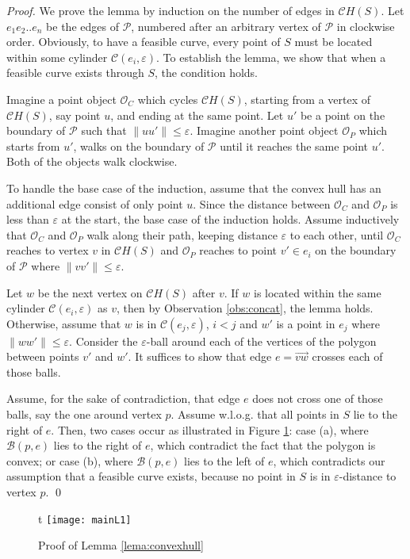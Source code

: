 \documentclass[a4paper,UKenglish]{lipics}
\newcommand{\eps}{\varepsilon}
\newcommand{\CB}{{\mathscr B}}
\newcommand{\CC}{{\mathscr C}}
\newcommand{\CO}{{\mathscr O}}
\newcommand{\Pol}{{\mathscr P}}
\newcommand{\CH}{{\mathscr CH}}
\newcommand{\Dir}{\overrightarrow}
\newcommand{\pset}{S}
\begin{document}
\begin{proof}
We prove the lemma by induction on the number of 
edges in $\CH(\pset)$. 
Let  $e_1e_2..e_n$ be the edges of $\Pol$, numbered 
after an arbitrary vertex of $\Pol$ in clockwise order. 
Obviously, to have a feasible curve, 
every point of $\pset$ must be located within some cylinder $\CC(e_i, \eps)$.
To establish the lemma, we show that when a feasible curve
exists through $\pset$, the condition holds. 

Imagine a point object
$\CO_C$ which cycles $\CH(\pset)$, 
starting from a vertex of 
$\CH(S)$, say point $u$, and ending at the same point.
Let $u'$ be a point on the boundary of $\Pol$ such that 
$\| uu' \| \le \eps$.
Imagine another point object $\CO_P$  
which starts from $u'$, 
walks on the boundary of $\Pol$ until it reaches the same point $u'$.
Both of the objects walk clockwise. 

To handle the base case of the induction, assume that 
the convex hull has an additional edge consist 
of only  point $u$. Since the distance between
$\CO_C$ and $\CO_P$ is less 
than $\eps$ at the start,
the base case of the induction holds. 
Assume inductively that $\CO_C$  and $\CO_P$
walk along their path, keeping distance $\eps$
to each other, until 
$\CO_C$  reaches to vertex $v$ in $\CH(S)$
and $\CO_P$ reaches to point $v' \in e_i$ on the boundary of $\Pol$
where $\|vv'\| \le \eps$.

Let $w$ be the next  vertex  on $\CH(S)$
after $v$. If $w$ is located within the same 
cylinder $\CC(e_i, \eps)$ as $v$, 
then by Observation \ref{obs:concat}, the lemma holds. 
Otherwise, assume that 
$w$ is in $\CC(e_j, \eps)$, $i<j$ and 
$w'$ is a point in $e_j$ where $\|ww'\| \le \eps$. 
Consider the $\eps$-ball around each of the vertices of 
the polygon between points $v'$ and $w'$. 
It suffices to show that edge $e = \Dir{vw}$ crosses 
each of those balls.


Assume, for the sake of contradiction, that edge $e$ 
does not cross one of those balls, say the one around 
vertex $p$. 
Assume w.l.o.g. that all points 
in $\pset$ lie to the right of $e$.
Then, two cases occur as illustrated in Figure \ref{fig:convexHull}: 
case (a), where $\CB(p,e)$ lies to the right of $e $, which contradict 
the fact that the polygon is convex;
or case (b), where $\CB(p,e)$ lies to the left of $e $, which contradicts 
our assumption that a feasible curve exists, 
because
no point in $\pset$ is in $\eps$-distance to vertex $p$.
\qed
\end{proof}



\begin{figure}{t}
	\centering
	\texttt{[image: mainL1]}
	\caption{Proof of Lemma \ref{lema:convexhull}}
	\label{fig:convexHull}
\end{figure}
\end{document}

